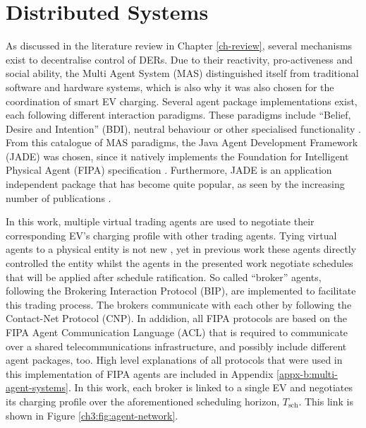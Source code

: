 \section{Distributed Systems}
\label{ch3:sec:distributed-systems}

As discussed in the literature review in Chapter \ref{ch-review}, several mechanisms exist to decentralise control of DERs.
Due to their reactivity, pro-activeness and social ability, the Multi Agent System (MAS) distinguished itself from traditional software and hardware systems, which is also why it was also chosen for the coordination of smart EV charging.
Several agent package implementations exist, each following different interaction paradigms.
These paradigms include ``Belief, Desire and Intention'' (BDI), neutral behaviour or other specialised functionality \cite{Luck2004}.
From this catalogue of MAS paradigms, the Java Agent Development Framework (JADE) was chosen, since it natively implements the Foundation for Intelligent Physical Agent (FIPA) specification \cite{JADE-website, FIPA-agent-specs}.
Furthermore, JADE is an application independent package that has become quite popular, as seen by the increasing number of publications \cite{Karfopoulos2013, Eddy2011, Kuo2013, Mocci2014, Li2017}.

In this work, multiple virtual trading agents are used to negotiate their corresponding EV's charging profile with other trading agents.
Tying virtual agents to a physical entity is not new \cite{Nagata2002, Dimeas2005, Nguyen2011, Nagata2012}, yet in previous work these agents directly controlled the entity whilst the agents in the presented work negotiate schedules that will be applied after schedule ratification.
So called ``broker'' agents, following the Brokering Interaction Protocol (BIP), are implemented to facilitate this trading process.
The brokers communicate with each other by following the Contact-Net Protocol (CNP).
In addidion, all FIPA protocols are based on the FIPA Agent Communication Language (ACL) that is required to communicate over a shared telecommunications infrastructure, and possibly include different agent packages, too.
High level explanations of all protocols that were used in this implementation of FIPA agents are included in Appendix \ref{appx-b:multi-agent-systems}.
In this work, each broker is linked to a single EV and negotiates its charging profile over the aforementioned scheduling horizon, $T_\text{sch}$.
This link is shown in Figure \ref{ch3:fig:agent-network}.



